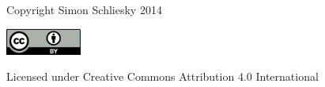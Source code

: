 Copyright Simon Schliesky 2014

\href{http://creativecommons.org/licenses/by/4.0/}{\includegraphics[width=2.5cm]{by}}

Licensed under Creative Commons Attribution 4.0 International

